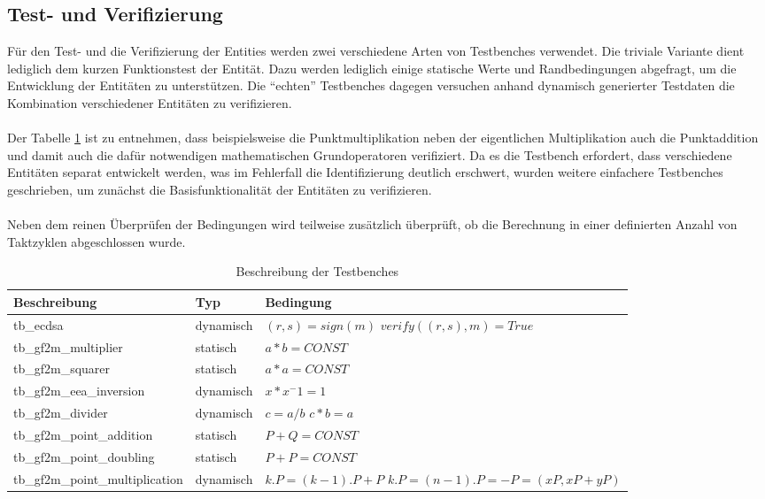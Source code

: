 \subsection{Test- und Verifizierung}
Für den Test- und die Verifizierung der Entities werden zwei verschiedene Arten von Testbenches verwendet. Die triviale Variante dient lediglich dem kurzen Funktionstest der Entität. Dazu werden lediglich einige statische Werte und Randbedingungen abgefragt, um die Entwicklung der Entitäten zu unterstützen. Die ``echten'' Testbenches dagegen versuchen anhand dynamisch generierter Testdaten die Kombination verschiedener Entitäten zu verifizieren.
\\ \\
Der Tabelle \ref{tab:vhdl-impl-testbenches} ist zu entnehmen, dass beispielsweise die Punktmultiplikation neben der eigentlichen Multiplikation auch die Punktaddition und damit auch die dafür notwendigen mathematischen Grundoperatoren verifiziert. Da es die Testbench erfordert, dass verschiedene Entitäten separat entwickelt werden, was im Fehlerfall die Identifizierung deutlich erschwert, wurden weitere einfachere Testbenches geschrieben, um zunächst die Basisfunktionalität der Entitäten zu verifizieren.
\\ \\
Neben dem reinen Überprüfen der Bedingungen wird teilweise zusätzlich überprüft, ob die Berechnung in einer definierten Anzahl von Taktzyklen abgeschlossen wurde.

\begin{table} [h]
	\centering 
	\begin{tabular}{ | p{5cm} | p{2cm} | p{8cm} | }
		\hline
		\textbf{Beschreibung} & \textbf{Typ} & \textbf{Bedingung}\\
		\hline
		tb\_ecdsa &  dynamisch & \parbox[t]{5cm}{$(r,s)=sign(m)$\\$verify((r,s),m)=True$}  \\
		\hline
		tb\_gf2m\_multiplier & statisch & $a * b = CONST$ \\
		\hline
		tb\_gf2m\_squarer & statisch & $ a * a = CONST$ \\
		\hline
		tb\_gf2m\_eea\_inversion & dynamisch & $x * x^-1 = 1$ \\
		\hline
		tb\_gf2m\_divider & dynamisch & \parbox[t]{5cm}{$c=a/b$\\$c*b=a$} \\
		\hline
		tb\_gf2m\_point\_addition & statisch & $P+Q = CONST $ \\
		\hline
		tb\_gf2m\_point\_doubling & statisch & $P+P = CONST$ \\
		\hline
		tb\_gf2m\_point\_multiplication & dynamisch & \parbox[t]{10cm}{$k.P = (k-1).P + P$\\$k.P = (n-1).P = -P = (xP, xP+yP)$} \\
		\hline
	\end{tabular}
	\caption{Beschreibung der Testbenches}
	\label{tab:vhdl-impl-testbenches}
\end{table}

